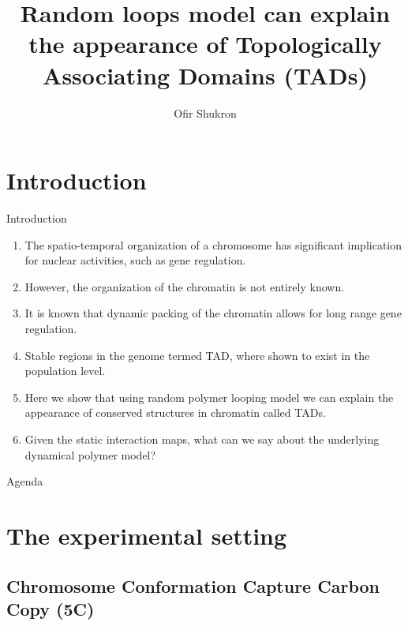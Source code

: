 \documentclass[8pt]{beamer}
\title{Random loops model can explain the appearance of Topologically Associating Domains (TADs)}
\author{Ofir Shukron}
\begin{document}
\begin{frame} %
\titlepage
\end{frame}

\section{Introduction}\label{section_introduction}

\begin{frame}{Introduction}
\begin{enumerate}
\item The spatio-temporal organization of a chromosome has significant implication for nuclear activities, such as gene regulation. 
\item However, the organization of the chromatin is not entirely known.
\item It is known that dynamic packing of the chromatin allows for long range gene regulation.
\item Stable regions in the genome termed TAD, where shown to exist in the population level. 
\item Here we show that using random polymer looping model we can explain the appearance of conserved structures in chromatin called TADs.
\item Given the static interaction maps, what can we say about the underlying dynamical polymer model?
\end{enumerate}
\end{frame}

\begin{frame}{Agenda}
\tableofcontents
\end{frame}

\section{The experimental setting}\label{section_theExperimentalSetting}

\subsection{Chromosome Conformation Capture Carbon Copy (5C)}\label{subsection_chromosomeConformationCaptureExperiments}
\end{document}
